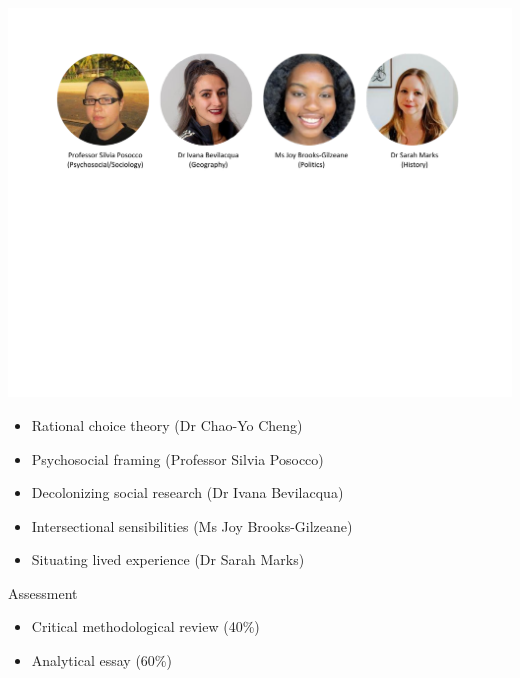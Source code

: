 \documentclass[
  10pt,
  ignorenonframetext,
]{beamer}
\begin{document}
\begin{frame}
\vspace{0.2cm}

\begin{center}\includegraphics[width=1\linewidth]{Figs/guest} \end{center}
\vspace{0.5cm}
\begin{itemize}
  \item Rational choice theory (Dr Chao-Yo Cheng)
  \item Psychosocial framing (Professor Silvia Posocco)
  \item Decolonizing social research (Dr Ivana Bevilacqua)
  \item Intersectional sensibilities (Ms Joy Brooks-Gilzeane)
  \item Situating lived experience (Dr Sarah Marks)
\end{itemize}
\end{frame}

\begin{frame}{Assessment}
\protect\hypertarget{assessment}{}
\begin{itemize}
  \item Critical methodological review (40\%)
  \vspace{1cm}
  \item Analytical essay (60\%)
\end{itemize}
\end{frame}
\end{document}
